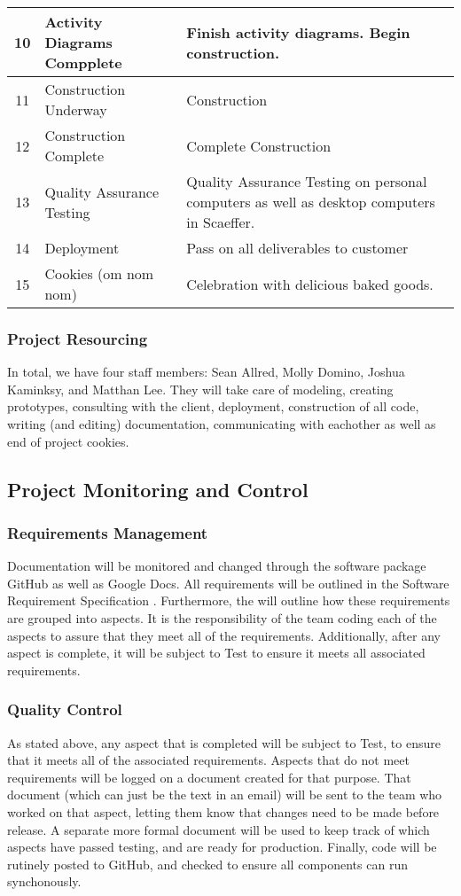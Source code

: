 \documentclass{article}
\begin{document}
\begin{tabular}{|c|l|p{4in}|}
10	&Activity Diagrams Compplete		&Finish activity diagrams. Begin construction.\\ \hline
11	&Construction Underway			&Construction\\ \hline
12	&Construction Complete			&Complete Construction\\ \hline
13	&Quality Assurance Testing		&Quality Assurance Testing on personal computers as well as desktop computers in Scaeffer.\\ \hline
14	&Deployment				&Pass on all deliverables to customer\\ \hline
15	&Cookies (om nom nom)			&Celebration with delicious baked goods.\\ \hline
\end{tabular}
\subsubsection{Project Resourcing}
In total, we have four staff members: Sean Allred, Molly Domino, Joshua Kaminksy, and Matthan Lee. They will take care of modeling, creating prototypes, consulting with the client, deployment, construction of all code, writing (and editing) documentation, communicating with eachother as well as end of project cookies.
\subsection{Project Monitoring and Control}
\subsubsection{Requirements Management}
Documentation will be monitored and changed through the software package GitHub as well as Google Docs. All requirements will be outlined in the Software Requirement Specification \cite{SRS}. Furthermore, the %
will outline how these requirements are grouped into aspects. It is the responsibility of the team coding each of the aspects to assure that they meet all of the requirements. Additionally, after any aspect is complete, it will be subject to Test to ensure it meets all associated requirements.
\subsubsection{Quality Control}
As stated above, any aspect that is completed will be subject to Test, to ensure that it meets all of the associated requirements. Aspects that do not meet requirements will be logged on a document created for that purpose. That document (which can just be the text in an email) will be sent to the team who worked on that aspect, letting them know that changes need to be made before release. A separate more formal document will be used to keep track of which aspects have passed testing, and are ready for production. Finally, code will be rutinely posted to GitHub, and checked to ensure all components can run synchonously.
\end{document}
